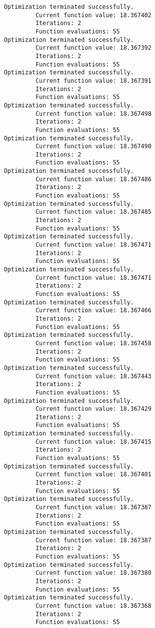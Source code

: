 \documentclass[11pt]{article}
\begin{document}
\begin{Verbatim}[commandchars=\\\{\}]
Optimization terminated successfully.
         Current function value: 18.367402
         Iterations: 2
         Function evaluations: 55
Optimization terminated successfully.
         Current function value: 18.367392
         Iterations: 2
         Function evaluations: 55
Optimization terminated successfully.
         Current function value: 18.367391
         Iterations: 2
         Function evaluations: 55
Optimization terminated successfully.
         Current function value: 18.367498
         Iterations: 2
         Function evaluations: 55
Optimization terminated successfully.
         Current function value: 18.367490
         Iterations: 2
         Function evaluations: 55
Optimization terminated successfully.
         Current function value: 18.367486
         Iterations: 2
         Function evaluations: 55
Optimization terminated successfully.
         Current function value: 18.367485
         Iterations: 2
         Function evaluations: 55
Optimization terminated successfully.
         Current function value: 18.367471
         Iterations: 2
         Function evaluations: 55
Optimization terminated successfully.
         Current function value: 18.367471
         Iterations: 2
         Function evaluations: 55
Optimization terminated successfully.
         Current function value: 18.367466
         Iterations: 2
         Function evaluations: 55
Optimization terminated successfully.
         Current function value: 18.367458
         Iterations: 2
         Function evaluations: 55
Optimization terminated successfully.
         Current function value: 18.367443
         Iterations: 2
         Function evaluations: 55
Optimization terminated successfully.
         Current function value: 18.367429
         Iterations: 2
         Function evaluations: 55
Optimization terminated successfully.
         Current function value: 18.367415
         Iterations: 2
         Function evaluations: 55
Optimization terminated successfully.
         Current function value: 18.367401
         Iterations: 2
         Function evaluations: 55
Optimization terminated successfully.
         Current function value: 18.367387
         Iterations: 2
         Function evaluations: 55
Optimization terminated successfully.
         Current function value: 18.367387
         Iterations: 2
         Function evaluations: 55
Optimization terminated successfully.
         Current function value: 18.367380
         Iterations: 2
         Function evaluations: 55
Optimization terminated successfully.
         Current function value: 18.367368
         Iterations: 2
         Function evaluations: 55

\end{Verbatim}
\end{document}
